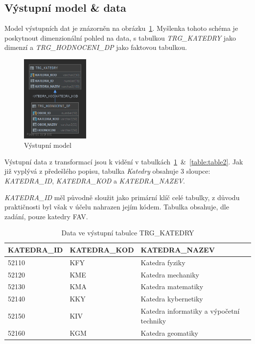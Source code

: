 \subsection{Výstupní model \& data}

Model výstupních dat je znázorněn na obrázku~\ref{fig:trg-model}.
Myšlenka tohoto schéma je poskytnout dimenzionální pohled na data, s tabulkou \textit{TRG\_KATEDRY} jako dimenzí a \textit{TRG\_HODNOCENI\_DP} jako faktovou tabulkou.

\begin{figure}[htb]
    \centering
    \includegraphics[width=0.3\textwidth]{graphs/trg-model.png}
    \caption{Výstupní model}
    \label{fig:trg-model}
\end{figure}
\FloatBarrier

Výstupní data z transformací jsou k vidění v tabulkách~\ref{table:table1}~\&~\ref{table:table2}.
Jak již vyplývá z předešlého popisu, tabulka \textit{Katedry} obsahuje 3 sloupce: \textit{KATEDRA\_ID}, \textit{KATEDRA\_KOD} a \textit{KATEDRA\_NAZEV}.

\textit{KATEDRA\_ID} měl původně sloužit jako primární klíč celé tabulky, z důvodu praktičnosti byl však v účelu nahrazen jejím kódem.
Tabulka obsahuje, dle zadání, pouze katedry FAV.

\begin{table}[htb]
    \centering

    \begin{tabular}{lll}
        \toprule

        KATEDRA\_ID & KATEDRA\_KOD  & KATEDRA\_NAZEV                            \\ \midrule
        52110       & KFY           & Katedra fyziky                            \\
        52120       & KME           & Katedra mechaniky                         \\
        52130       & KMA           & Katedra matematiky                        \\
        52140       & KKY           & Katedra kybernetiky                       \\
        52150       & KIV           & Katedra informatiky a výpočetní techniky  \\
        52160       & KGM           & Katedra geomatiky                         \\
          
        \bottomrule
    \end{tabular}

    \caption{Data ve výstupní tabulce TRG\_KATEDRY}
    \label{table:table1}
\end{table}
\FloatBarrier

